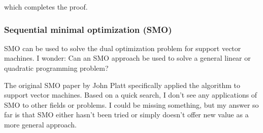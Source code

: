 \documentclass[]{article}
\begin{document}
which completes the proof.

\subsubsection{Sequential minimal optimization
(SMO)}\label{sequential-minimal-optimization-smo}

SMO can be used to solve the dual optimization problem for support
vector machines. I wonder: Can an SMO approach be used to solve a
general linear or quadratic programming problem?

The original SMO paper by John Platt specifically applied the algorithm
to support vector machines. Based on a quick search, I don't see any
applications of SMO to other fields or problems. I could be missing
something, but my answer so far is that SMO either hasn't been tried or
simply doesn't offer new value as a more general approach.

\hypertarget{refs}{}
\end{document}
